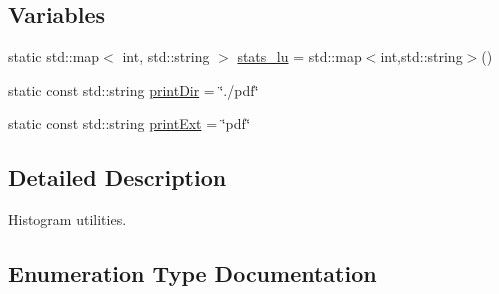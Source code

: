 \subsection*{Variables}
\begin{DoxyCompactItemize}
\item 
static std\+::map$<$ int, std\+::string $>$ \hyperlink{namespaceHistUtils_aa3bb9be93085f86cfa38e98f525f525b}{stats\+\_\+lu} = std\+::map$<$int,std\+::string$>$()
\item 
static const std\+::string \hyperlink{namespaceHistUtils_ab479dbe64897488a53c190bf8eba173c}{print\+Dir} = \char`\"{}./pdf\char`\"{}
\item 
static const std\+::string \hyperlink{namespaceHistUtils_acb065721325221957da36e6ac87c0062}{print\+Ext} = \char`\"{}pdf\char`\"{}
\end{DoxyCompactItemize}


\subsection{Detailed Description}
Histogram utilities. 

\subsection{Enumeration Type Documentation}
